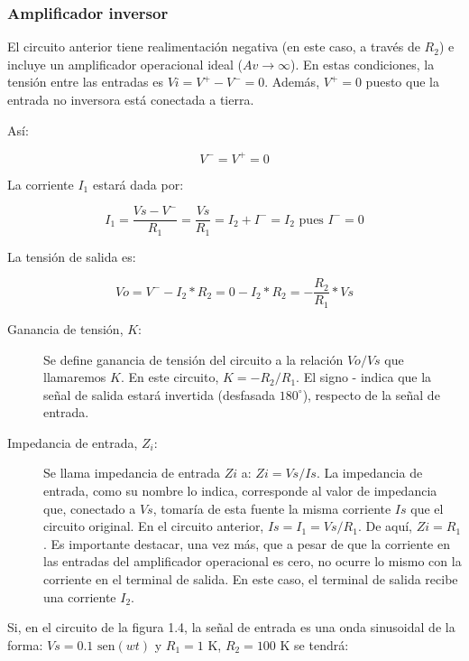 \subsubsection{Amplificador inversor}
El circuito anterior tiene realimentación negativa (en este caso, a través de $R_2$) e incluye un amplificador operacional ideal ($Av \to \infty$). En estas condiciones, la tensión entre las entradas es $Vi = V^+ - V^- = 0$. Además, $V^+ = 0$ puesto que la entrada no inversora está conectada a tierra.

Así:

\begin{equation}
	V^- = V^+ = 0
\end{equation}

La corriente $I_1$ estará dada por:

\begin{equation}
	I_1 = \frac{Vs - V^-}{R_1} = \frac{Vs}{R_1} = I_2 + I^- = I_2 \text{ pues } I^- = 0
\end{equation}

La tensión de salida es:

\begin{equation}
	Vo = V^- - I_2 * R_2 = 0 - I_2 * R_2 = - \frac{R_2}{R_1} * Vs
\end{equation}

\begin{description}
	\item[Ganancia de tensión, $K$:] Se define ganancia de tensión del circuito a la relación $Vo/Vs$ que llamaremos $K$. En este circuito, $K = - R_2/R_1$. El signo - indica que la señal de salida estará invertida (desfasada $180^\circ$), respecto de la señal de entrada.
	\item[Impedancia de entrada, $Z_i$:] Se llama impedancia de entrada $Zi$ a: $Zi = Vs/Is$. La impedancia de entrada, como su nombre lo indica, corresponde al valor de impedancia que, conectado a $Vs$, tomaría de esta fuente la misma corriente $Is$ que el circuito original. En el circuito anterior, $Is = I_1 = Vs/R_1$. De aquí, $Zi = R_1$. Es importante destacar, una vez más, que a pesar de que la corriente en las entradas del amplificador operacional es cero, no ocurre lo mismo con la corriente en el terminal de salida. En este caso, el terminal de salida recibe una corriente $I_2$.
\end{description}

Si, en el circuito de la figura 1.4, la señal de entrada es una onda sinusoidal de la forma: $Vs = 0.1 \text{ sen}(wt)$ y $R_1 = 1\text{ K}$, $R_2 = 100\text{ K}$ se tendrá:

